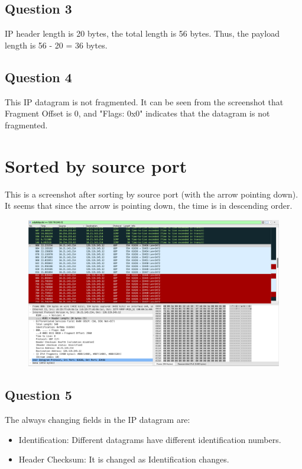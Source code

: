\documentclass{article}
\begin{document}
\begin{CJK*}{UTF8}{gbsn}
\subsection{Question 3}
IP header length is 20 bytes, the total length is 56 bytes.
Thus, the payload length is 56 - 20 = 36 bytes.
\subsection{Question 4}
This IP datagram is not fragmented. It can be seen from the screenshot that Fragment Offset is 0, and "Flags: 0x0" indicates that the datagram is not fragmented.
\section{Sorted by source port}
This is a screenshot after sorting by source port (with the arrow pointing down). It seems that since the arrow is pointing down, the time is in descending order.
\begin{figure}[H]
    \centering
    \includegraphics[width=1.0\textwidth]{5.png}
\end{figure}
\subsection{Question 5}
The always changing fields in the IP datagram are:
\begin{itemize}
    \item Identification: Different datagrams have different identification numbers.
    \item Header Checksum: It is changed as Identification changes.
\end{itemize}

\end{CJK*}
\end{document}
